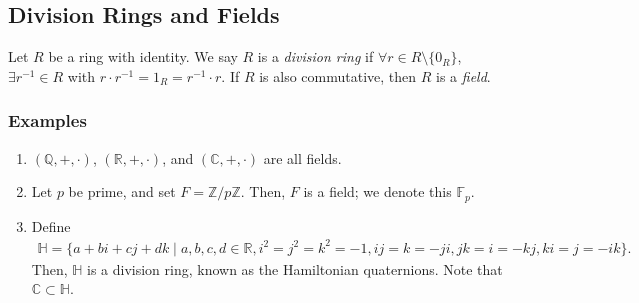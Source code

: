 \documentclass[10pt]{extarticle}
\newcommand{\Q}{\mathbb{Q}}
\newcommand{\Z}{\mathbb{Z}}
\newcommand{\R}{\mathbb{R}}
\begin{document}
  \subsection{Division Rings and Fields}%
  Let $R$ be a ring with identity. We say $R$ is a \textit{division ring} if $\forall r\in R\setminus \{0_R\}$, $\exists r^{-1}\in R$ with $r\cdot r^{-1} = 1_R = r^{-1}\cdot r$. If $R$ is also commutative, then $R$ is a \textit{field}.
  \subsubsection{Examples}%
  \begin{enumerate}[(1)]
    \item $(\Q,+,\cdot)$, $(\R,+,\cdot)$, and $(\mathbb{C},+,\cdot)$ are all fields.
    \item Let $p$ be prime, and set $F = \Z/p\Z$. Then, $F$ is a field; we denote this $\mathbb{F}_p$.
    \item Define 
      \begin{align*}
        \mathbb{H} = \{a+bi+cj+dk\mid a,b,c,d\in\R,i^2=j^2=k^2=-1,ij=k=-ji,jk=i=-kj,ki=j=-ik\}.
      \end{align*}
      Then, $\mathbb{H}$ is a division ring, known as the Hamiltonian quaternions. Note that $\mathbb{C}\subset \mathbb{H}$.
  \end{enumerate}
\end{document}
